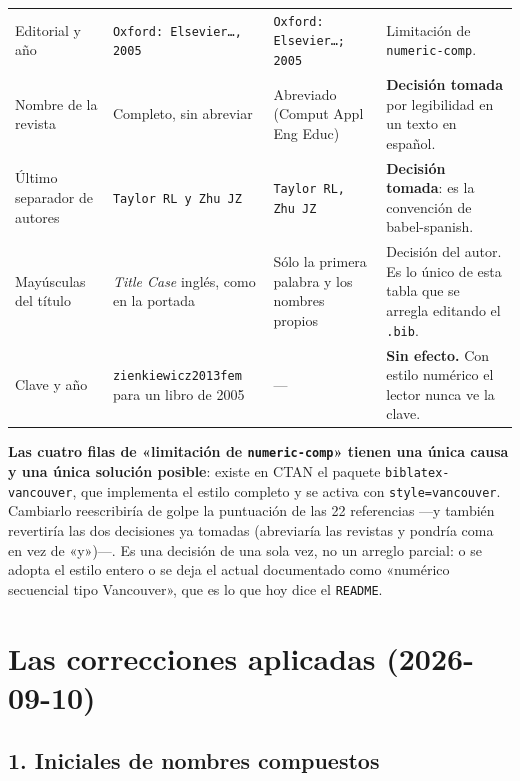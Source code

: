 \documentclass[11pt,a4paper]{article}
\begin{document}
{\begin{longtable}{@{}p{2.5cm}p{4.3cm}p{4.3cm}p{3.9cm}@{}}
Editorial y año &
\texttt{Oxford: Elsevier\ldots, 2005} &
\texttt{Oxford: Elsevier\ldots; 2005} &
Limitación de \texttt{numeric-comp}. \\
\addlinespace[3pt]

Nombre de la revista &
Completo, sin abreviar &
Abreviado (Comput Appl Eng Educ) &
\textcolor{bien}{\textbf{Decisión tomada}} por legibilidad en un texto en español. \\
\addlinespace[3pt]

Último separador de autores &
\texttt{Taylor RL y Zhu JZ} &
\texttt{Taylor RL, Zhu JZ} &
\textcolor{bien}{\textbf{Decisión tomada}}: es la convención de babel-spanish. \\
\addlinespace[3pt]

Mayúsculas del título &
\emph{Title Case} inglés, como en la portada &
Sólo la primera palabra y los nombres propios &
Decisión del autor. Es lo único de esta tabla que se arregla editando el \texttt{.bib}. \\
\addlinespace[3pt]

Clave y año &
\texttt{zienkiewicz2013fem} para un libro de 2005 &
--- &
\textcolor{bien}{\textbf{Sin efecto.}} Con estilo numérico el lector nunca ve la clave. \\
\bottomrule
\end{longtable}}

\begin{nota}
\textbf{Las cuatro filas de «limitación de \texttt{numeric-comp}» tienen una única causa y una
única solución posible}: existe en CTAN el paquete \texttt{biblatex-vancouver}, que implementa
el estilo completo y se activa con \texttt{style=vancouver}. Cambiarlo reescribiría de golpe
la puntuación de las 22 referencias ---y también revertiría las dos decisiones ya tomadas
(abreviaría las revistas y pondría coma en vez de «y»)---. Es una decisión de una sola vez, no
un arreglo parcial: o se adopta el estilo entero o se deja el actual documentado como
«numérico secuencial tipo Vancouver», que es lo que hoy dice el \texttt{README}.
\end{nota}

\section{Las correcciones aplicadas (2026-09-10)}

\subsection*{1. Iniciales de nombres compuestos}
\end{document}
